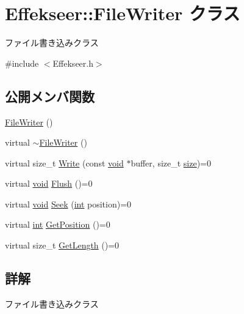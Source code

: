 \hypertarget{class_effekseer_1_1_file_writer}{}\section{Effekseer\+:\+:File\+Writer クラス}
\label{class_effekseer_1_1_file_writer}


ファイル書き込みクラス  




{\ttfamily \#include $<$Effekseer.\+h$>$}

\subsection*{公開メンバ関数}
\begin{DoxyCompactItemize}
\item 
\mbox{\hyperlink{class_effekseer_1_1_file_writer_a7f8a88996d7bffbff900787feebd81dd}{File\+Writer}} ()
\item 
virtual \mbox{\hyperlink{class_effekseer_1_1_file_writer_aa4959a2a84ec4754b615d6b665d71988}{$\sim$\+File\+Writer}} ()
\item 
virtual size\+\_\+t \mbox{\hyperlink{class_effekseer_1_1_file_writer_a7bdd5dc4f70f8e83c03de7e96af5dc27}{Write}} (const \mbox{\hyperlink{namespace_effekseer_ab34c4088e512200cf4c2716f168deb56}{void}} $\ast$buffer, size\+\_\+t \mbox{\hyperlink{namespace_effekseer_a73c68f3d33539d30844b9d1e058077f7}{size}})=0
\item 
virtual \mbox{\hyperlink{namespace_effekseer_ab34c4088e512200cf4c2716f168deb56}{void}} \mbox{\hyperlink{class_effekseer_1_1_file_writer_a319bba7ef4e98e98a5248accbee98df1}{Flush}} ()=0
\item 
virtual \mbox{\hyperlink{namespace_effekseer_ab34c4088e512200cf4c2716f168deb56}{void}} \mbox{\hyperlink{class_effekseer_1_1_file_writer_a9057c57df33d5112bc0d2c4e3e0c542d}{Seek}} (\mbox{\hyperlink{namespace_effekseer_ace0abf7c2e6947e519ebe8b54cbcc30a}{int}} position)=0
\item 
virtual \mbox{\hyperlink{namespace_effekseer_ace0abf7c2e6947e519ebe8b54cbcc30a}{int}} \mbox{\hyperlink{class_effekseer_1_1_file_writer_a656bbee191e65ccc63791d5c41c6e853}{Get\+Position}} ()=0
\item 
virtual size\+\_\+t \mbox{\hyperlink{class_effekseer_1_1_file_writer_a6baf95dec7700d2c7a5e71c6c4f76724}{Get\+Length}} ()=0
\end{DoxyCompactItemize}


\subsection{詳解}
ファイル書き込みクラス 

